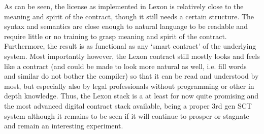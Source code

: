 \documentclass{article}
\begin{document}


As can be seen, the license as implemented in Lexon is relatively close to the meaning and spirit of the contract, though it still needs a certain structure. The syntax and semantics are close enough to natural language to be readable and require little or no training to grasp meaning and spirit of the contract. Furthermore, the result is as functional as any ‘smart contract’ of the underlying system.
Most importantly however, the Lexon contract still mostly looks and feels like a contract (and could be made to look more natural as well, i.e. fill words and similar do not bother the compiler) so that it can be read and understood by most, but especially also by legal professionals without programming or other in depth knowledge.
Thus, the Lexon stack is a at least for now quite promising and the most advanced digital contract stack available, being a proper 3rd gen SCT system %
although it remains to be seen if it will continue to prosper or stagnate and remain an interesting experiment.
\end{document}
